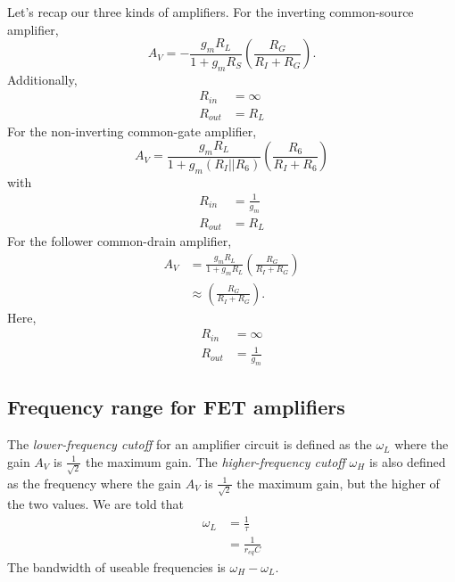 \documentclass[nobib]{tufte-handout}
\begin{document}
Let's recap our three kinds of amplifiers.
For the inverting common-source amplifier, 
\begin{equation} \label{eq:29}
    A_V = -\frac{g_m R_L}{1 + g_m R_S} \left(\frac{R_G}{R_I+R_G}\right).
\end{equation}
Additionally, 
\begin{align} \label{eq:30}
    R_{in} &= \infty \\
    R_{out} &= R_L
\end{align}
For the non-inverting common-gate amplifier, 
\begin{equation} \label{eq:31}
    A_V = \frac{g_m R_L}{1 + g_m(R_I || R_6)} \left(\frac{R_6}{R_I+R_6}\right)
\end{equation}
with 
\begin{align} \label{eq:32}
    R_{in} &= \frac{1}{g_m} \\
    R_{out} &= R_L 
\end{align}
For the follower common-drain amplifier, 
\begin{align} \label{eq:33}
    A_V &= \frac{g_m R_L}{1 + g_m R_L} \left(\frac{R_G}{R_I+R_G}\right) \\
    &\approx \left(\frac{R_G}{R_I + R_G}\right). 
\end{align}
Here, 
\begin{align} \label{eq:34}
    R_{in} &= \infty \\
    R_{out} &= \frac{1}{g_m}
\end{align}

\subsection{Frequency range for FET amplifiers}

The \emph{lower-frequency cutoff} for an 
amplifier circuit is defined as the $\omega_L$ 
where the gain $A_V$ is $\frac{1}{\sqrt{2}}$
the maximum gain. The \emph{higher-frequency cutoff} $\omega_H$
is also defined as the frequency
where the gain $A_V$ is $\frac{1}{\sqrt{2}}$
the maximum gain, but the higher of the two 
values. We are told that 
\begin{align} \label{eq:omega_L}
    \omega_L &= \frac{1}{\tau} \\
    &= \frac{1}{r_{eq}C}
\end{align}
The bandwidth of useable frequencies is 
$\omega_H - \omega_L$. 
\end{document}

